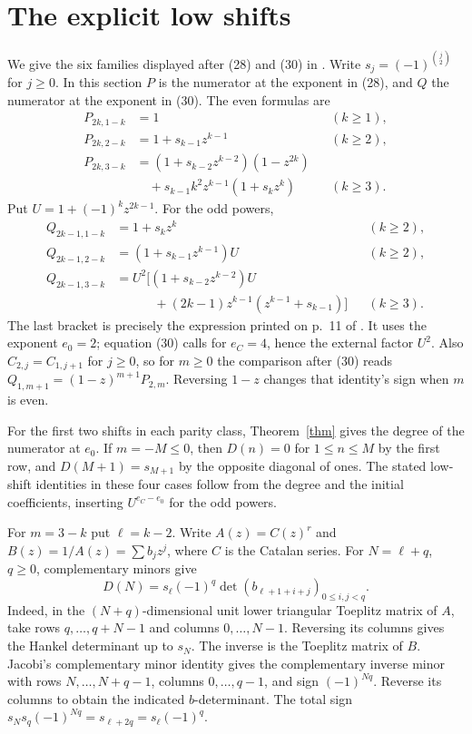 \documentclass[11pt]{article}
\begin{document}
\section{The explicit low shifts}
We give the six families displayed after (28) and (30) in \cite{cigler}. Write $s_j=(-1)^{\binom j2}$ for $j\ge0$. In this section $P$ is the numerator at the exponent in (28), and $Q$ the numerator at the exponent in (30). The even formulas are
\begin{align*}
 P_{2k,1-k}&=1 &&(k\ge1),\\
 P_{2k,2-k}&=1+s_{k-1}z^{k-1} &&(k\ge2),\\
 P_{2k,3-k}&=(1+s_{k-2}z^{k-2})(1-z^{2k})\\
 &\quad+s_{k-1}k^2z^{k-1}(1+s_k z^k) &&(k\ge3).
\end{align*}
Put $U=1+(-1)^kz^{2k-1}$. For the odd powers,
\begin{align*}
 Q_{2k-1,1-k}&=1+s_k z^k &&(k\ge2),\\
 Q_{2k-1,2-k}&=(1+s_{k-1}z^{k-1})U &&(k\ge2),\\
 Q_{2k-1,3-k}&=U^2\big[(1+s_{k-2}z^{k-2})U\\
 &\qquad\quad +(2k-1)z^{k-1}(z^{k-1}+s_{k-1})\big] &&(k\ge3).
\end{align*}
The last bracket is precisely the expression printed on p.~11 of \cite{cigler}. It uses the exponent $e_0=2$; equation (30) calls for $e_C=4$, hence the external factor $U^2$. Also $C_{2,j}=C_{1,j+1}$ for $j\ge0$, so for $m\ge0$ the comparison after (30) reads $Q_{1,m+1}=(1-z)^{m+1}P_{2,m}$. Reversing $1-z$ changes that identity's sign when $m$ is even.

For the first two shifts in each parity class, Theorem~\ref{thm} gives the degree of the numerator at $e_0$. If $m=-M\le0$, then $D(n)=0$ for $1\le n\le M$ by the first row, and $D(M+1)=s_{M+1}$ by the opposite diagonal of ones. The stated low-shift identities in these four cases follow from the degree and the initial coefficients, inserting $U^{e_C-e_0}$ for the odd powers.

For $m=3-k$ put $\ell=k-2$. Write $A(z)=C(z)^r$ and $B(z)=1/A(z)=\sum b_j z^j$, where $C$ is the Catalan series. For $N=\ell+q$, $q\ge0$, complementary minors give
\begin{equation}\label{comp}
 D(N)=s_\ell(-1)^q\det(b_{\ell+1+i+j})_{0\le i,j<q}.
\end{equation}
Indeed, in the $(N+q)$-dimensional unit lower triangular Toeplitz matrix of $A$, take rows $q,\ldots,q+N-1$ and columns $0,\ldots,N-1$. Reversing its columns gives the Hankel determinant up to $s_N$. The inverse is the Toeplitz matrix of $B$. Jacobi's complementary minor identity gives the complementary inverse minor with rows $N,\ldots,N+q-1$, columns $0,\ldots,q-1$, and sign $(-1)^{Nq}$. Reverse its columns to obtain the indicated $b$-determinant. The total sign $s_Ns_q(-1)^{Nq}=s_{\ell+2q}=s_\ell(-1)^q$.
\end{document}
